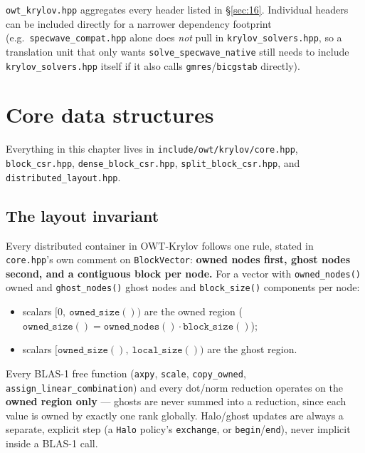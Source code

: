 \documentclass[11pt,a4paper]{report}
\newcommand{\secref}[1]{\S\ref{#1}}
\begin{document}
\texttt{owt\_krylov.hpp} aggregates every header listed in
\secref{sec:16}. Individual headers can be included directly for a
narrower dependency footprint (e.g.\ \texttt{specwave\_compat.hpp} alone
does \emph{not} pull in \texttt{krylov\_solvers.hpp}, so a translation
unit that only wants \lstinline!solve_specwave_native! still needs to include
\texttt{krylov\_solvers.hpp} itself if it also calls \lstinline!gmres!/\lstinline!bicgstab!
directly).

\chapter{Core data structures}
\label{sec:3}

Everything in this chapter lives in \texttt{include/owt/krylov/core.hpp},
\texttt{block\_csr.hpp}, \texttt{dense\_block\_csr.hpp},
\texttt{split\_block\_csr.hpp}, and \texttt{distributed\_layout.hpp}.

\section{The layout invariant}
\label{sec:3.1}

Every distributed container in OWT-Krylov follows one rule, stated in
\texttt{core.hpp}'s own comment on \lstinline!BlockVector!: \textbf{owned nodes
first, ghost nodes second, and a contiguous block per node.} For a
vector with \lstinline!owned_nodes()! owned and \lstinline!ghost_nodes()! ghost nodes
and \lstinline!block_size()! components per node:

\begin{itemize}
\item scalars $[0,\ \mathtt{owned\_size()})$ are the owned region
  ($\mathtt{owned\_size()} = \mathtt{owned\_nodes()}\cdot\mathtt{block\_size()}$);
\item scalars $[\mathtt{owned\_size()},\ \mathtt{local\_size()})$ are the ghost region.
\end{itemize}

Every BLAS-1 free function (\lstinline!axpy!, \lstinline!scale!, \lstinline!copy_owned!,
\lstinline!assign_linear_combination!) and every dot/norm reduction operates on
the \textbf{owned region only} --- ghosts are never summed into a
reduction, since each value is owned by exactly one rank globally.
Halo/ghost updates are always a separate, explicit step (a
\lstinline!Halo! policy's \lstinline!exchange!, or \lstinline!begin!/\lstinline!end!), never implicit
inside a BLAS-1 call.
\end{document}
